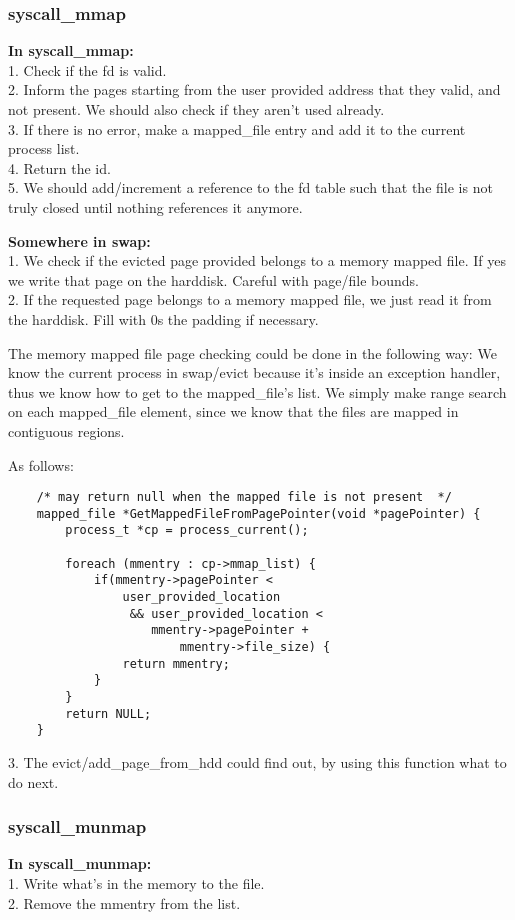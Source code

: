 \subsubsection{ syscall\_mmap }
\textbf{In syscall\_mmap:}
	\\1. Check if the fd is valid.
	\\2. Inform the pages starting from the user provided address that they valid, and not present. We should also check if they aren't used already.
	\\3. If there is no error, make a mapped\_file entry and add it to the current process list.
	\\4. Return the id.
	\\5. We should add/increment a reference to the fd table such that the file is not truly closed until nothing references it anymore.



	\textbf{Somewhere in swap:}
	\\1. We check if the evicted page provided belongs to a memory mapped file. If yes we write that page on the harddisk. Careful with page/file bounds.
	\\2. If the requested page belongs to a memory mapped file, we just read it from the harddisk. Fill with 0s the padding if necessary.

The memory mapped file page checking could be done in the following way: We know the current process in swap/evict because it's inside an exception handler, thus we know how to get to the mapped\_file's list. We simply make range search on each mapped\_file element, since we know that the files are mapped in contiguous regions.

As follows:
\begin{lstlisting}	
	/* may return null when the mapped file is not present  */
	mapped_file *GetMappedFileFromPagePointer(void *pagePointer) {
		process_t *cp = process_current();
		
		foreach (mmentry : cp->mmap_list) {
			if(mmentry->pagePointer < 
				user_provided_location 
				 && user_provided_location < 
					mmentry->pagePointer + 
						mmentry->file_size) {
				return mmentry;
			}
		}
		return NULL;
	}
\end{lstlisting}
	3. The evict/add\_page\_from\_hdd could find out, by using this function what to do next.

\subsubsection{ syscall\_munmap }
\textbf{In syscall\_munmap:}
	\\1. Write what's in the memory to the file. 
	\\2. Remove the mmentry from the list.


